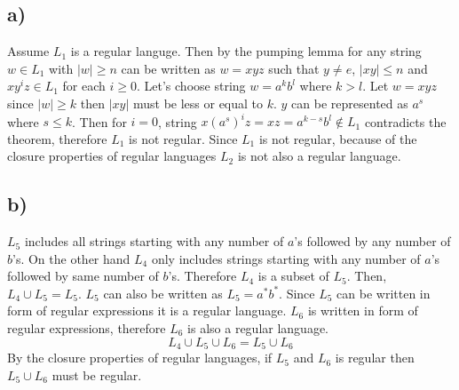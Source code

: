\documentclass[12pt]{article}
\begin{document}
\subsection*{a)}
Assume $L_1$ is a regular languge. Then by the pumping lemma for any string $w \in L_1$ with $\mid w \mid \geq n$ can be written as $w = xyz$ such that $y \neq e$, $\mid xy \mid \leq n$ and $xy^iz \in L_1$ for each $i \geq 0$.
Let's choose string $w = a^kb^l$ where $k > l$. Let $w = xyz$ since $|w| \geq k $ then $|xy|$ must be less or equal to $k$. $y$ can be represented as $a^s$ where $s \leq k$. Then for $i=0$, string $x(a^s)^iz = xz = a^{k-s}b^l \notin L_1$ contradicts the theorem, therefore $L_1$ is not regular.
Since $L_1$ is not regular, because of the closure properties of regular languages $L_2$ is not also a regular language.
\subsection*{b)}
$L_5$ includes all strings starting with any number of $a$'s followed by any number of $b$'s. On the other hand $L_4$ only includes strings starting with any number of $a$'s followed by same number of $b$'s. Therefore $L_4$ is a subset of $L_5$. Then, $L_4 \cup L_5 = L_5$. $L_5$ can also be written as $L_5 = a^*b^*$. Since $L_5$ can be written in form of regular expressions it is a regular language. $L_6$ is written in form of regular expressions, therefore $L_6$ is also a regular language.
\begin{equation*}
	L_4 \cup L_5 \cup L_6 = L_5 \cup L_6
\end{equation*}
By the closure properties of regular languages, if $L_5$ and $L_6$ is regular then $L_5 \cup L_6$ must be regular. 
\end{document}
